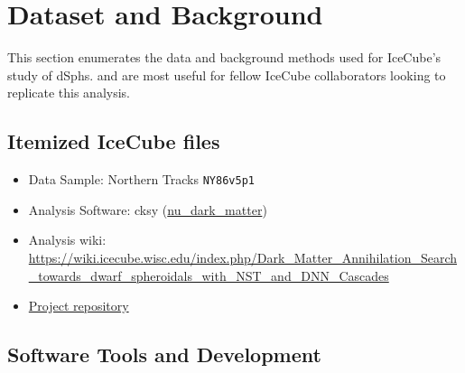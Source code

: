 \section{Dataset and Background}\label{sec:icDM_databgd}

This section enumerates the data and background methods used for IceCube's study of dSphs.
 and  are most useful for fellow IceCube collaborators looking to replicate this analysis.

\subsection{Itemized IceCube files}\label{sec:icDM_data}
\begin{itemize}
    \item Data Sample: Northern Tracks \texttt{NY86v5p1}
    \item Analysis Software: cksy (\href{https://github.com/icecube/csky/tree/nu\_dark\_matter}{nu\_dark\_matter})
    \item Analysis wiki: \url{https://wiki.icecube.wisc.edu/index.php/Dark\_Matter\_Annihilation\_Search\_towards\_dwarf\_spheroidals\_with\_NST\_and\_DNN\_Cascades}
    \item \href{https://github.com/salaza82/IceCube_dark_matter_dsph}{Project repository}
\end{itemize}

\subsection{Software Tools and Development}\label{sec:icDM_tools}



%

%
%
%
%

